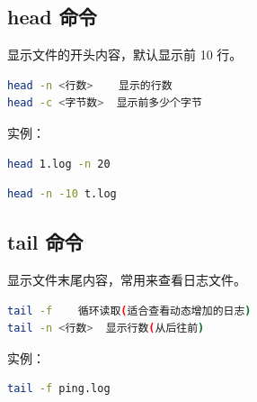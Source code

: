 \documentclass[12pt,a4paper]{ctexbook}
\begin{document}
\subsection{head 命令}
显示文件的开头内容，默认显示前 10 行。
\begin{lstlisting}[language=bash,title={head 常用参数}]
head -n <行数>    显示的行数
head -c <字节数>  显示前多少个字节
\end{lstlisting}
实例：
\begin{lstlisting}[language=bash,title={显示 1.log 文件中前 20 行}]
    head 1.log -n 20
\end{lstlisting}
\begin{lstlisting}[language=bash,title={显示最后 10 行(行数为负数表示从后往前数)}]
    head -n -10 t.log
\end{lstlisting}

\subsection{tail 命令}
显示文件末尾内容，常用来查看日志文件。
\begin{lstlisting}[language=bash,title={tail 常用参数}]
tail -f    循环读取(适合查看动态增加的日志)
tail -n <行数>  显示行数(从后往前)
\end{lstlisting}
实例：
\begin{lstlisting}[language=bash,title={循环读取逐渐增加的文件内容}]
    tail -f ping.log
\end{lstlisting}
\end{document}
